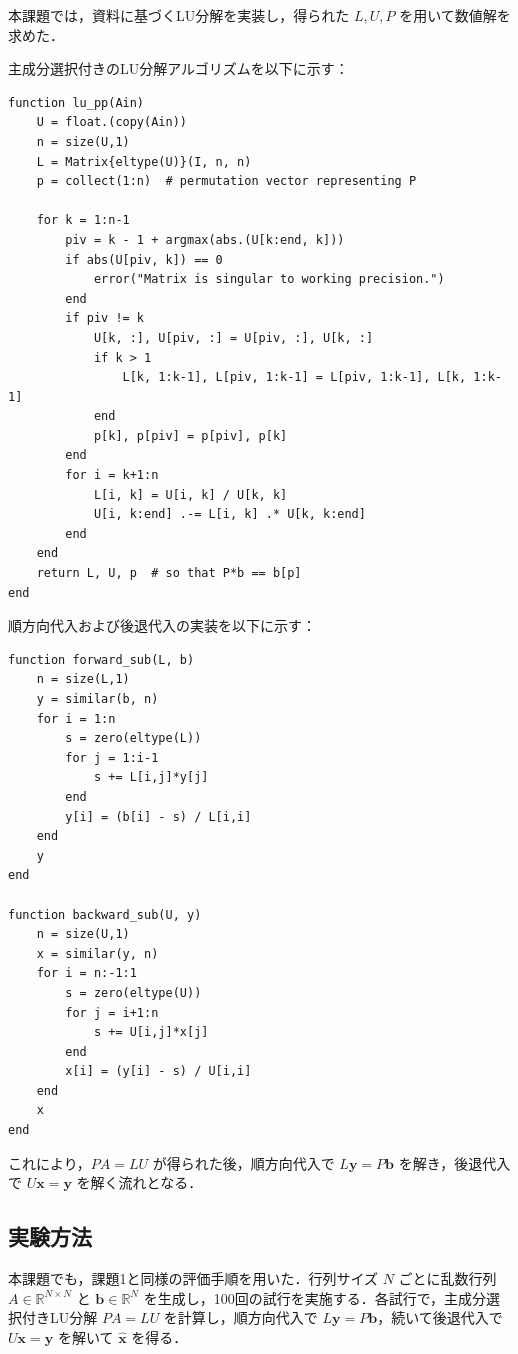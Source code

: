 \documentclass[a4paper,11pt]{ltjsarticle}
\begin{document}
本課題では，資料に基づくLU分解を実装し，得られた $L,U,P$ を用いて数値解を求めた．

主成分選択付きのLU分解アルゴリズムを以下に示す：

\begin{verbatim}
function lu_pp(Ain)
    U = float.(copy(Ain))
    n = size(U,1)
    L = Matrix{eltype(U)}(I, n, n)
    p = collect(1:n)  # permutation vector representing P

    for k = 1:n-1
        piv = k - 1 + argmax(abs.(U[k:end, k]))
        if abs(U[piv, k]) == 0
            error("Matrix is singular to working precision.")
        end
        if piv != k
            U[k, :], U[piv, :] = U[piv, :], U[k, :]
            if k > 1
                L[k, 1:k-1], L[piv, 1:k-1] = L[piv, 1:k-1], L[k, 1:k-1]
            end
            p[k], p[piv] = p[piv], p[k]
        end
        for i = k+1:n
            L[i, k] = U[i, k] / U[k, k]
            U[i, k:end] .-= L[i, k] .* U[k, k:end]
        end
    end
    return L, U, p  # so that P*b == b[p]
end
\end{verbatim}

順方向代入および後退代入の実装を以下に示す：

\begin{verbatim}
function forward_sub(L, b)
    n = size(L,1)
    y = similar(b, n)
    for i = 1:n
        s = zero(eltype(L))
        for j = 1:i-1
            s += L[i,j]*y[j]
        end
        y[i] = (b[i] - s) / L[i,i]
    end
    y
end

function backward_sub(U, y)
    n = size(U,1)
    x = similar(y, n)
    for i = n:-1:1
        s = zero(eltype(U))
        for j = i+1:n
            s += U[i,j]*x[j]
        end
        x[i] = (y[i] - s) / U[i,i]
    end
    x
end
\end{verbatim}



これにより，$P A = L U$ が得られた後，順方向代入で $L\boldsymbol{y}=P\boldsymbol{b}$ を解き，後退代入で $U\boldsymbol{x}=\boldsymbol{y}$ を解く流れとなる．

\subsection{実験方法}
本課題でも，課題1と同様の評価手順を用いた．行列サイズ $N$ ごとに乱数行列 $A\in\mathbb{R}^{N\times N}$ と $\boldsymbol{b}\in\mathbb{R}^N$ を生成し，100回の試行を実施する．各試行で，主成分選択付きLU分解 $PA=LU$ を計算し，順方向代入で $L\boldsymbol{y}=P\boldsymbol{b}$，続いて後退代入で $U\boldsymbol{x}=\boldsymbol{y}$ を解いて $\hat{\boldsymbol{x}}$ を得る．
\end{document}
